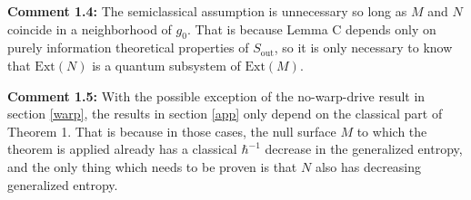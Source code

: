 \documentclass[12pt]{article}
\begin{document}
\textbf{Comment 1.4:} The semiclassical assumption is unnecessary so long as $M$ and $N$ coincide in a neighborhood of $g_0$.  That is because Lemma C depends only on purely information theoretical properties of $S_\mathrm{out}$, so it is only necessary to know that 
$\mathrm{Ext}(N)$ is a quantum subsystem of $\mathrm{Ext}(M)$.

\textbf{Comment 1.5:} With the possible exception of the no-warp-drive result in section \ref{warp}, the results in section \ref{app} only depend on the classical part of Theorem 1.  That is because in those cases, the null surface $M$ to which the theorem is applied already has a classical $\hbar^{-1}$ decrease in the generalized entropy, and the only thing which needs to be proven is that $N$ also has decreasing generalized entropy.


\end{document}
